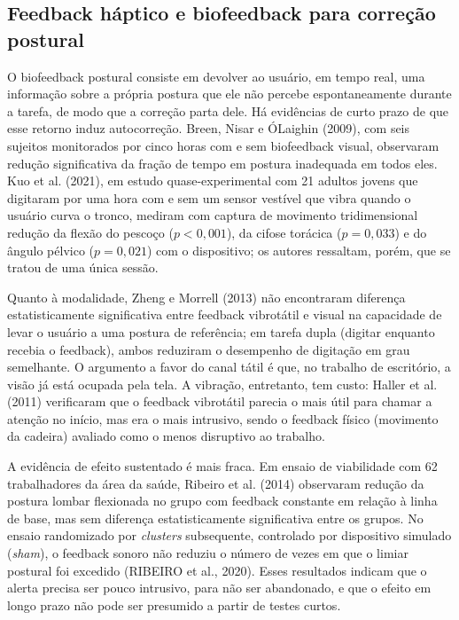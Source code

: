 \subsection{Feedback háptico e biofeedback para correção postural}
\label{sec:rev-feedback}

O biofeedback postural consiste em devolver ao usuário, em tempo real, uma
informação sobre a própria postura que ele não percebe espontaneamente durante a
tarefa, de modo que a correção parta dele. Há evidências de curto prazo de que
esse retorno induz autocorreção. Breen, Nisar e ÓLaighin (2009), com seis sujeitos
monitorados por cinco horas com e sem biofeedback visual, observaram redução
significativa da fração de tempo em postura inadequada em todos eles. Kuo et al.
(2021), em estudo quase-experimental com 21 adultos jovens que digitaram por uma
hora com e sem um sensor vestível que vibra quando o usuário curva o tronco,
mediram com captura de movimento tridimensional redução da flexão do pescoço
($p < 0{,}001$), da cifose torácica ($p = 0{,}033$) e do ângulo pélvico
($p = 0{,}021$) com o dispositivo; os autores ressaltam, porém, que se tratou de uma
única sessão.

Quanto à modalidade, Zheng e Morrell (2013) não encontraram diferença
estatisticamente significativa entre feedback vibrotátil e visual na capacidade de
levar o usuário a uma postura de referência; em tarefa dupla (digitar enquanto
recebia o feedback), ambos reduziram o desempenho de digitação em grau semelhante.
O argumento a favor do canal tátil é que, no trabalho de escritório, a visão já
está ocupada pela tela. A vibração, entretanto, tem custo: Haller et al. (2011)
verificaram que o feedback vibrotátil parecia o mais útil para chamar a atenção no
início, mas era o mais intrusivo, sendo o feedback físico (movimento da cadeira)
avaliado como o menos disruptivo ao trabalho.

A evidência de efeito sustentado é mais fraca. Em ensaio de viabilidade com 62
trabalhadores da área da saúde, Ribeiro et al. (2014) observaram redução da postura
lombar flexionada no grupo com feedback constante em relação à linha de base, mas
sem diferença estatisticamente significativa entre os grupos. No ensaio
randomizado por \emph{clusters} subsequente, controlado por dispositivo simulado
(\emph{sham}), o feedback sonoro não reduziu o número de vezes em que o limiar
postural foi excedido (RIBEIRO et al., 2020). Esses resultados indicam que o alerta
precisa ser pouco intrusivo, para não ser abandonado, e que o efeito em longo prazo
não pode ser presumido a partir de testes curtos.

